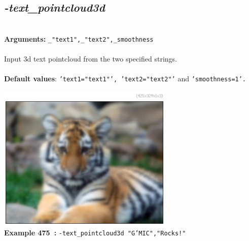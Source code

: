 \documentclass[a4paper,11pt,twoside]{book}
\begin{document}
\subsection{\emph{-text\_pointcloud3d} }\vspace*{-0.5em}
~\\\textbf{Arguments: } 
{\small \texttt{\_"text1",\_"text2",\_smoothness}}\\~\\
Input 3d text pointcloud from the two specified strings.
~\\~\\\textbf{Default values}: {\small \texttt{'text1="text1"', 'text2="text2"'} and \texttt{'smoothness=1'.}}
\begin{center}\includegraphics[keepaspectratio=true,height=7cm,width=\textwidth]{img/gmic_def475.jpg}\\
{\footnotesize \textbf{Example 475~:} \texttt{-text\_pointcloud3d "G'MIC","Rocks!"}}
\end{center}
\end{document}
